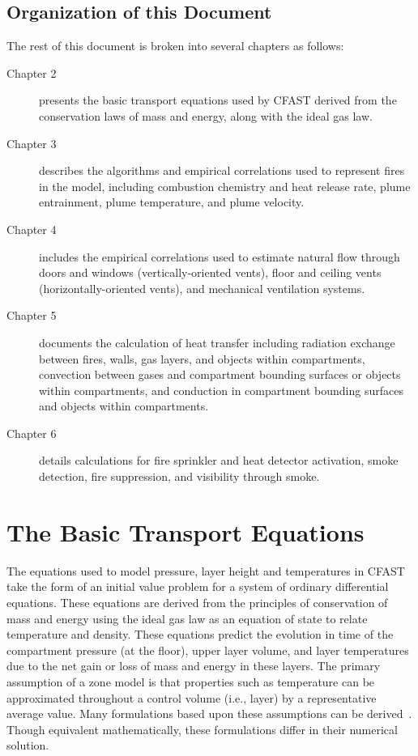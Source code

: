 \documentclass[12pt,twoside]{book}
\begin{document}
\section{Organization of this Document}

The rest of this document is broken into several chapters as follows:

\begin{description}
\item[Chapter 2] presents the basic transport equations used by CFAST derived from the conservation laws of mass and energy, along with the ideal gas law.
\item[Chapter 3] describes the algorithms and empirical correlations used to represent fires in the model, including combustion chemistry and heat release rate, plume entrainment, plume temperature, and plume velocity.
\item[Chapter 4] includes the empirical correlations used to estimate natural flow through doors and windows (vertically-oriented vents), floor and ceiling vents (horizontally-oriented vents), and mechanical ventilation systems.
\item[Chapter 5] documents the calculation of heat transfer including radiation exchange between fires, walls, gas layers, and objects within compartments, convection between gases and compartment bounding surfaces or objects within compartments, and conduction in compartment bounding surfaces and objects within compartments.
\item[Chapter 6] details calculations for fire sprinkler and heat detector activation, smoke detection, fire suppression, and visibility through smoke.
\end{description}

%
%

\chapter{The Basic Transport Equations}
\label{sec:Theory_Chapter}

The equations used to model pressure, layer height and temperatures in CFAST take the form of an initial value problem for a system of ordinary differential equations. These equations are derived from the principles of conservation of mass and energy using the ideal gas law as an equation of state to relate temperature and density. These equations predict the evolution in time of the compartment pressure (at the floor), upper layer volume, and layer temperatures due to the net gain or loss of mass and energy in these layers. The primary assumption of a zone model is that properties such as temperature can be approximated throughout a control volume (i.e., layer) by a representative average value. Many formulations based upon these assumptions can be derived~\cite{Forney:1994}. Though equivalent mathematically, these formulations differ in their numerical solution.
\end{document}
